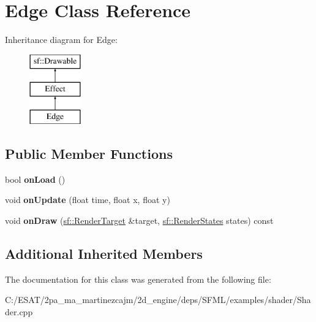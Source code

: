 \hypertarget{class_edge}{}\section{Edge Class Reference}
\label{class_edge}
Inheritance diagram for Edge\+:\begin{figure}[H]
\begin{center}
\leavevmode
\includegraphics[height=3.000000cm]{class_edge}
\end{center}
\end{figure}
\subsection*{Public Member Functions}
\begin{DoxyCompactItemize}
\item 
\mbox{\label{class_edge_a85a432189d48b34f17f154d59814a7ed}} 
bool {\bfseries on\+Load} ()
\item 
\mbox{\label{class_edge_a7a803416ae1c07a17a7fb1bee8d4821c}} 
void {\bfseries on\+Update} (float time, float x, float y)
\item 
\mbox{\label{class_edge_a865269e6bc1bd90d6160b5c38f15757f}} 
void {\bfseries on\+Draw} (\hyperlink{classsf_1_1_render_target}{sf\+::\+Render\+Target} \&target, \hyperlink{classsf_1_1_render_states}{sf\+::\+Render\+States} states) const
\end{DoxyCompactItemize}
\subsection*{Additional Inherited Members}


The documentation for this class was generated from the following file\+:\begin{DoxyCompactItemize}
\item 
C\+:/\+E\+S\+A\+T/2pa\+\_\+ma\+\_\+martinezcajm/2d\+\_\+engine/deps/\+S\+F\+M\+L/examples/shader/Shader.\+cpp\end{DoxyCompactItemize}
